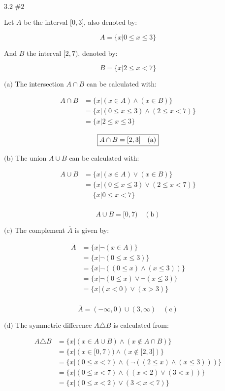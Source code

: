 \documentclass{article}
\newcommand{\problem}[2]{$\boxed{\text{#1 \##2}}$}
\newcommand{\subproblem}[1]{$\boxed{\text{(#1)}}$}
\newcommand{\subsolution}[2]{\boxed{#2\quad(\text{#1})}}
\newcommand{\multistep}[1]{\begin{array}{rl} #1 \end{array}}
\begin{document}
\begin{multicols*}{2}

%
\problem{3.2}{2}

Let $A$ be the interval $\lbrack0,3\rbrack$, also denoted by:

\[
A=\{x|0\le x\le 3\}
\]

And $B$ the interval $\lbrack2,7)$, denoted by:

\[
B=\{x|2\le x<7\}
\]

%
\subproblem{a} The intersection $A\cap{}B$ can be calculated with:

\[
\begin{array}{rl}
A\cap B&=\{x|(x\in A)\wedge(x\in B)\} \\
&=\{x|(0\le x\le 3)\wedge(2\le x<7)\} \\
&=\{x|2\le x\le 3\}
\end{array}
\]

\[
\subsolution{a}{A\cap B=\lbrack 2,3\rbrack} \\
\]

%
\subproblem{b} The union $A\cup{}B$ can be calculated with:

\[
\begin{array}{rl}
A\cup B&=\{x|(x\in A)\vee(x\in B)\} \\
&=\{x|(0\le x\le 3)\vee(2\le x<7)\} \\
&=\{x|0\le x<7\} \\
\end{array}
\]

\[
\subsolution{b}{A\cup B=\lbrack 0,7)}
\]

%
\subproblem{c} The complement $\overline{A}$ is given by:

\[
\multistep{
\overline{A}&=\{x|\neg(x\in A)\} \\
&=\{x|\neg(0\le x\le 3)\} \\
&=\{x|\neg((0\le x)\wedge(x\le 3))\} \\
&=\{x|\neg(0\le x)\vee\neg(x\le 3)\} \\
&=\{x|(x<0)\vee(x>3)\} \\
}
\]

\[
\subsolution{c}{\overline{A}=(-\infty,0)\cup(3,\infty)}
\]

%
\subproblem{d} The symmetric difference $A\triangle{}B$ is calculated
from:

\[
\multistep{
A\triangle B&=\{x|(x\in A\cup B)\wedge(x\not\in A\cap B)\} \\
&=\{x|(x\in\lbrack0,7))\wedge(x\not\in \lbrack2,3\rbrack)\} \\
&=\{x|(0\le x<7)\wedge(\neg((2\le x)\wedge(x\le 3)))\} \\
&=\{x|(0\le x<7)\wedge((x<2)\vee(3<x))\} \\
&=\{x|(0\le x<2)\vee(3<x<7)\} \\
}
\]


\end{multicols*}
\end{document}
